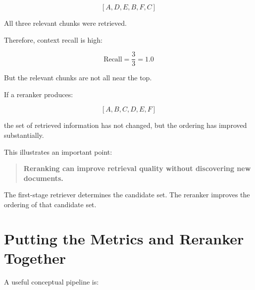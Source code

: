 \documentclass[12pt, a4paper]{article}
\begin{document}
\[
[A,D,E,B,F,C]
\]

All three relevant chunks were retrieved.

Therefore, context recall is high:

\[
\text{Recall} = \frac{3}{3}=1.0
\]

But the relevant chunks are not all near the top.

If a reranker produces:

\[
[A,B,C,D,E,F]
\]

the set of retrieved information has not changed, but the ordering has improved substantially.

This illustrates an important point:

\begin{quote}
\textbf{Reranking can improve retrieval quality without discovering new documents.}
\end{quote}

The first-stage retriever determines the candidate set. The reranker improves the ordering of that candidate set.

\section{Putting the Metrics and Reranker Together}

A useful conceptual pipeline is:
\\
\end{document}

